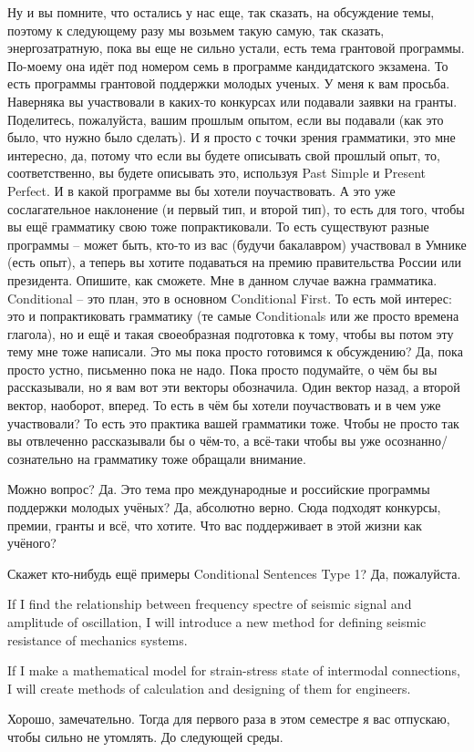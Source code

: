 \documentclass[main.tex]{subfiles}
\begin{document}
Ну и вы помните, что остались у нас еще, так сказать, на обсуждение темы, поэтому к следующему разу мы возьмем такую самую, так сказать, энергозатратную, пока вы еще не сильно устали, есть тема грантовой программы.
По-моему она идёт под номером семь в программе кандидатского экзамена.
То есть программы грантовой поддержки молодых ученых.
У меня к вам просьба.
Наверняка вы участвовали в каких-то конкурсах или подавали заявки на гранты.
Поделитесь, пожалуйста, вашим прошлым опытом, если вы подавали (как это было, что нужно было сделать).
И я просто с точки зрения грамматики, это мне интересно, да, потому что если вы будете описывать свой прошлый опыт, то, соответственно, вы будете описывать это, используя Past Simple и Present Perfect.
И в какой программе вы бы хотели поучаствовать.
А это уже сослагательное наклонение (и первый тип, и второй тип), то есть для того, чтобы вы ещё грамматику свою тоже попрактиковали.
То есть существуют разные программы -- может быть, кто-то из вас (будучи бакалавром) участвовал в Умнике (есть опыт), а теперь вы хотите подаваться на премию правительства России или президента.
Опишите, как сможете.
Мне в данном случае важна грамматика.
Conditional -- это план, это в основном Conditional First.
То есть мой интерес: это и попрактиковать грамматику (те самые Conditionals или же просто времена глагола), но и ещё и такая своеобразная подготовка к тому, чтобы вы потом эту тему мне тоже написали.
Это мы пока просто готовимся к обсуждению?
Да, пока просто устно, письменно пока не надо.
Пока просто подумайте, о чём бы вы рассказывали, но я вам вот эти векторы обозначила.
Один вектор назад, а второй вектор, наоборот, вперед.
То есть в чём бы хотели поучаствовать и в чем уже участвовали?
То есть это практика вашей грамматики тоже.
Чтобы не просто так вы отвлеченно рассказывали бы о чём-то, а всё-таки чтобы вы уже осознанно/сознательно на грамматику тоже обращали внимание.

Можно вопрос?
Да.
Это тема про международные и российские программы поддержки молодых учёных?
Да, абсолютно верно.
Сюда подходят конкурсы, премии, гранты и всё, что хотите.
Что вас поддерживает в этой жизни как учёного?

Скажет кто-нибудь ещё примеры Conditional Sentences Type 1?
Да, пожалуйста.

If I find the relationship between frequency spectre of seismic signal and amplitude of oscillation, I will introduce a new method for defining seismic resistance of mechanics systems.

If I make a mathematical model for strain-stress state of intermodal connections, I will create methods of calculation and designing of them for engineers.

Хорошо, замечательно.
Тогда для первого раза в этом семестре я вас отпускаю, чтобы сильно не утомлять.
До следующей среды.
\end{document}

